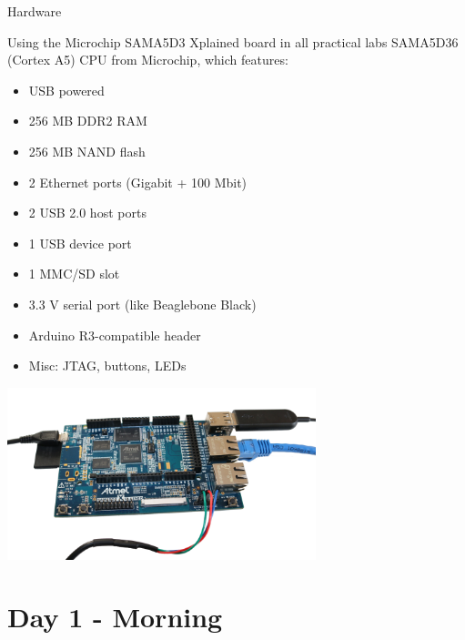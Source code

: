 \documentclass[a4paper,12pt,obeyspaces,spaces,hyphens]{article}
\begin{document}
\feagendatwocolumn
{Hardware}
{
	Using the Microchip SAMA5D3 Xplained board in all practical labs
	SAMA5D36 (Cortex A5) CPU from Microchip, which features:

  \begin{itemize}
  \item USB powered
  \item 256 MB DDR2 RAM
  \item 256 MB NAND flash
  \item 2 Ethernet ports (Gigabit + 100 Mbit)
  \item 2 USB 2.0 host ports
  \item 1 USB device port
  \item 1 MMC/SD slot
  \item 3.3 V serial port (like Beaglebone Black)
  \item Arduino R3-compatible header
  \item Misc: JTAG, buttons, LEDs
  \end{itemize}
}
{}
{
  \begin{center}
    \includegraphics[height=5cm]{../slides/xplained-board/xplained-board.png}
  \end{center}
}

\section{Day 1 - Morning}
\end{document}
